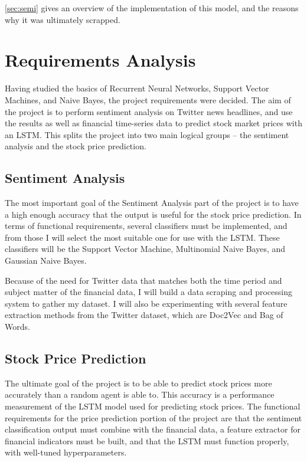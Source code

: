 \documentclass[12pt,a4paper,twoside,openright]{report}
\begin{document}
\cref{sec:semi} gives an overview of the implementation of this model, and the reasons why it was
ultimately scrapped.

\section{Requirements Analysis}
\label{sec:introReq}
Having studied the basics of Recurrent Neural Networks, Support Vector Machines, and
Naive Bayes, the project requirements were decided. The aim of the project is to
perform sentiment analysis on Twitter news headlines, and use the results as well as financial time-series data
to predict stock market prices with an LSTM. This splits the project into two main logical groups --
the sentiment analysis and the stock price prediction.

\subsection*{Sentiment Analysis}

The most important goal of the Sentiment Analysis part of the project is to
have a high enough accuracy that the output is useful for the stock price
prediction. In terms of functional requirements, several classifiers must be
implemented, and from those I will select the most suitable one for use
with the LSTM. These classifiers will be the Support Vector Machine,
Multinomial Naive Bayes, and Gaussian Naive Bayes. 

Because of the need for Twitter data that matches both the time period and
subject matter of the financial data, I will build a data scraping and processing
system to gather my dataset. I will also be experimenting
with several feature extraction methods from the Twitter dataset, which are
Doc2Vec\cite{Le14} and Bag of Words.


\subsection*{Stock Price Prediction}

The ultimate goal of the project is to be able to predict stock
prices more accurately than a random agent is able to. This accuracy
is a performance measurement of the LSTM model used for predicting
stock prices. The functional requirements for the price prediction
portion of the project are that the sentiment classification output
must combine with the financial data, a feature extractor for financial
indicators must be built, and that the LSTM must function properly, with
well-tuned hyperparameters.
\end{document}
